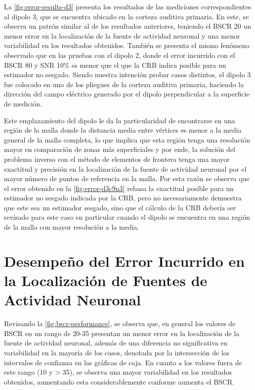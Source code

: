La \cref{fig:error-results-d3} presenta los resultados de las mediciones correspondientes al dipolo 3, que se encuentra ubicado en la corteza auditiva primaria. 
En este, se observa un patrón similar al de los resultados anteriores, teniendo el BSCR 20 un menor error en la localización de la fuente de actividad neuronal y una menor variabilidad en los resultados obtenidos.
También se presenta el mismo fenómeno observado que en las pruebas con el dipolo 2, donde el error incurrido con el BSCR 80 y SNR 10\% es menor que el que la CRB indica posible para un estimador no sesgado.
Siendo nuestra intención probar casos distintos, el dipolo 3 fue colocado en uno de los pliegues de la corteza auditiva primaria, haciendo la dirección del campo eléctrico generado por el dipolo perpendicular a la superficie de medición.

Este emplazamiento del dipolo le da la particularidad de encontrarse en una región de la malla donde la distancia media entre vértices es menor a la media general de la malla completa, lo que implica que esta región tenga una resolución mayor en comparación de zonas más superficiales y por ende, la solución del problema inverso con el método de elementos de frontera tenga una mayor exactitud y precisión en la localización de la fuente de actividad neuronal por el mayor número de puntos de referencia en la malla.
Por esta razón se observa que el error obtenido en la \cref{fig:error-d3c9n3} rebasa la exactitud posible para un estimador no sesgado indicada por la CRB, pero no necesariamente demuestra que este sea un estimador sesgado, sino que el cálculo de la CRB debería ser revisado para este caso en particular cuando el dipolo se encuentra en una región de la malla con mayor resolución a la media.

\section{Desempeño del Error Incurrido en la Localización de Fuentes de Actividad Neuronal}






Revisando la \cref{fig:bscr-performance}, se observa que, en general los valores de BSCR en un rango de 20-35 presentan un menor error en la localización de la fuente de actividad neuronal, además de una diferencia no significativa en variabilidad en la mayoría de los casos, denotada por la intersección de los intervalos de confianza en las gráficas de caja.
En cuanto a los valores fuera de este rango (10 y > 35), se observa una mayor variabilidad en los resultados obtenidos, aumentando esta considerablemente conforme aumenta el BSCR. 

